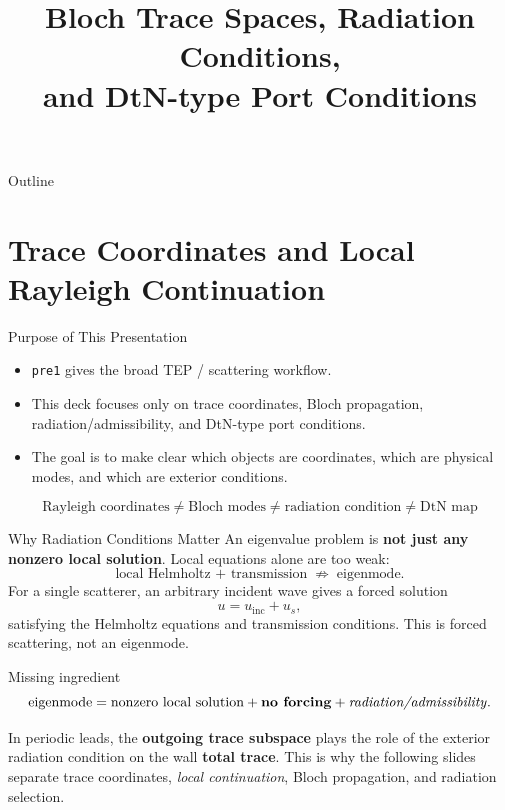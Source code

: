 \documentclass[aspectratio=169]{beamer}
\title[Bloch Trace Spaces]{Bloch Trace Spaces, Radiation Conditions,\\and DtN-type Port Conditions}
\author{}
\date{}
\begin{document}
\begin{frame}
  \titlepage
\end{frame}

\begin{frame}{Outline}
  \tableofcontents
\end{frame}

\section{Trace Coordinates and Local Rayleigh Continuation}

\begin{frame}{Purpose of This Presentation}
  \begin{itemize}
    \item \texttt{pre1} gives the broad TEP / scattering workflow.
    \item This deck focuses only on trace coordinates, Bloch propagation,
    radiation/admissibility, and DtN-type port conditions.
    \item The goal is to make clear which objects are coordinates, which are
    physical modes, and which are exterior conditions.
  \end{itemize}
  \[
    \boxed{
      \text{Rayleigh coordinates}
      \ne
      \text{Bloch modes}
      \ne
      \text{radiation condition}
      \ne
      \text{DtN map}
    }
  \]
\end{frame}

\begin{frame}{Why Radiation Conditions Matter}
  \small
  An eigenvalue problem is \textbf{not just any nonzero local solution}.
  Local equations alone are too weak:
  \[
    \text{local Helmholtz + transmission}
    \;\not\Rightarrow\;
    \text{eigenmode}.
  \]
  For a single scatterer, an arbitrary incident wave gives a forced solution
  \[
    u=u_{\mathrm{inc}}+u_s,
  \]
  satisfying the Helmholtz equations and transmission conditions.  This is
  forced scattering, not an eigenmode.

  \begin{block}{Missing ingredient}
    \[
      \text{eigenmode}
      =
      \text{nonzero local solution}
      +
      \text{\textbf{no forcing}}
      +
      \text{\emph{radiation/admissibility}}.
    \]
  \end{block}

  In periodic leads, the \textbf{outgoing trace subspace} plays the role of
  the exterior radiation condition on the wall \textbf{total trace}.  This is
  why the following slides separate trace coordinates, \emph{local
  continuation}, Bloch propagation, and radiation selection.
\end{frame}
\end{document}
